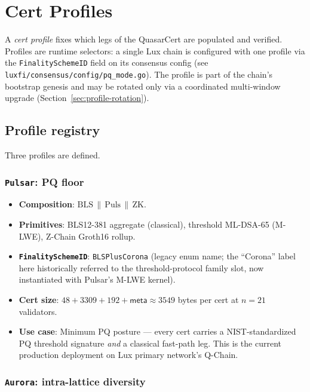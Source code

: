 \section{Cert Profiles}
\label{sec:profiles}

A \emph{cert profile} fixes which legs of the QuasarCert are populated
and verified. Profiles are runtime selectors: a single Lux chain is
configured with one profile via the \texttt{FinalitySchemeID} field on
its consensus config (see \texttt{luxfi/consensus/config/pq\_mode.go}).
The profile is part of the chain's bootstrap genesis and may be
rotated only via a coordinated multi-window upgrade
(Section~\ref{sec:profile-rotation}).

\subsection{Profile registry}
\label{sec:profile-registry}

Three profiles are defined.

\subsubsection*{\texttt{Pulsar}: PQ floor}

\begin{itemize}[leftmargin=2em,nosep]
\item \textbf{Composition}: $\mathrm{BLS} \,\|\, \mathrm{Puls} \,\|\, \mathrm{ZK}$.
\item \textbf{Primitives}: BLS12-381 aggregate (classical), threshold
      ML-DSA-65 (M-LWE), Z-Chain Groth16 rollup.
\item \textbf{\texttt{FinalitySchemeID}}: \texttt{BLSPlusCorona} (legacy
      enum name; the ``Corona'' label here historically referred to the
      threshold-protocol family slot, now instantiated with Pulsar's
      M-LWE kernel).
\item \textbf{Cert size}: $48 + 3309 + 192 + \mathsf{meta} \approx 3549$
      bytes per cert at $n = 21$ validators.
\item \textbf{Use case}: Minimum PQ posture --- every cert carries a
      NIST-standardized PQ threshold signature \emph{and} a classical
      fast-path leg. This is the current production deployment on
      Lux primary network's Q-Chain.
\end{itemize}

\subsubsection*{\texttt{Aurora}: intra-lattice diversity}

